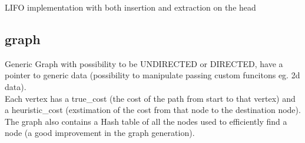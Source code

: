 LIFO implementation with both insertion and extraction on the head

\subsection{graph}

Generic Graph with possibility to be UNDIRECTED or DIRECTED, have a pointer to generic data (possibility to manipulate passing custom funcitons eg. 2d data). \\
Each vertex has a true\_cost (the cost of the path from start to that vertex) and a heuristic\_cost (exstimation of the cost from that node to the destination node).
The graph also contains a Hash table of all the nodes used to efficiently find a node (a good improvement in the graph generation).